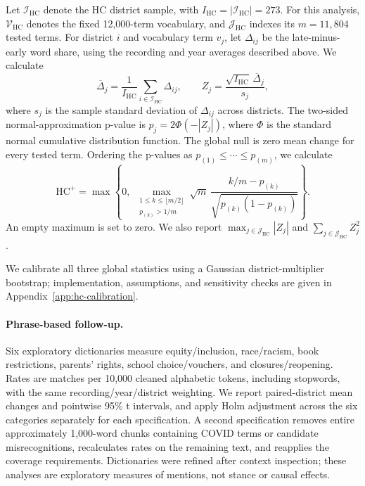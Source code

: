 \documentclass[12pt]{article}
\begin{document}
Let $\mathcal I_{\mathrm{HC}}$ denote the HC district sample,
with $I_{\mathrm{HC}}=|\mathcal I_{\mathrm{HC}}|=273$.
For this analysis, $\mathcal V_{\mathrm{HC}}$ denotes the fixed
12,000-term vocabulary, and $\mathcal J_{\mathrm{HC}}$ indexes
its $m=11{,}804$ tested terms. For district $i$ and vocabulary
term $v_j$, let $\Delta_{ij}$ be the late-minus-early word share,
using the recording and year averages described above. We calculate
\[
\overline{\Delta}_j
=
\frac{1}{I_{\mathrm{HC}}}
\sum_{i\in\mathcal I_{\mathrm{HC}}}\Delta_{ij},
\qquad
Z_j
=
\frac{\sqrt{I_{\mathrm{HC}}}\,
      \overline{\Delta}_j}{s_j},
\]
where $s_j$ is the sample standard deviation of $\Delta_{ij}$
across districts. The two-sided normal-approximation p-value is
$p_j=2\Phi(-|Z_j|)$, where $\Phi$ is the standard normal cumulative
distribution function. The global null is zero mean change for
every tested term. Ordering the p-values as
$p_{(1)}\leq\cdots\leq p_{(m)}$, we calculate
\begin{equation}
\mathrm{HC}^{+}
=
\max\left\{
0,\;
\max_{\substack{1\leq k\leq\lfloor m/2\rfloor\\
                p_{(k)}>1/m}}
\sqrt{m}\,
\frac{k/m-p_{(k)}}{\sqrt{p_{(k)}(1-p_{(k)})}}
\right\}.
\label{eq:hc}
\end{equation}
An empty maximum is set to zero. We also report
$\max_{j\in\mathcal J_{\mathrm{HC}}}|Z_j|$ and
$\sum_{j\in\mathcal J_{\mathrm{HC}}}Z_j^2$.

We calibrate all three global statistics using a Gaussian
district-multiplier bootstrap; implementation, assumptions,
and sensitivity checks are given in
Appendix~\ref{app:hc-calibration}.

\paragraph{Phrase-based follow-up.}
Six exploratory dictionaries measure equity/inclusion, race/racism,
book restrictions, parents' rights, school choice/vouchers, and
closures/reopening. Rates are matches per 10,000 cleaned alphabetic
tokens, including stopwords, with the same recording/year/district
weighting. We report paired-district mean changes and pointwise
95\% t intervals, and apply Holm adjustment across the six
categories separately for each specification. A second
specification removes entire approximately 1,000-word chunks
containing COVID terms or candidate misrecognitions, recalculates
rates on the remaining text, and reapplies the coverage requirements.
Dictionaries were refined after context inspection; these analyses
are exploratory measures of mentions, not stance or causal effects.
\end{document}
